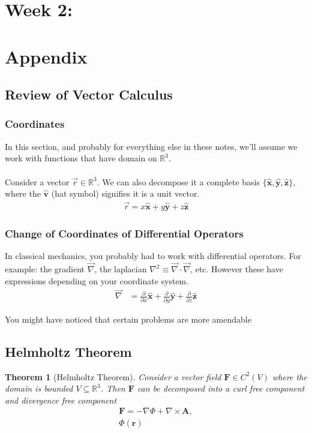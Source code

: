 \documentclass[12pt,fleqn]{article}
\numberwithin{equation}{section} %
\newtheorem{theorem}{Theorem}
\newcounter{problem}
\begin{document}
\newpage
\section{Week 2: }


\newpage
\section{Appendix}

\subsection{Review of Vector Calculus}
\subsubsection{Coordinates}
In this section, and probably for everything else in these notes, we'll assume we work with functions that have domain on $\mathbb R^3$.\\
\\
Consider a vector $\vec r \in \mathbb R^3$. We can also decompose it a complete basis $\{\mathbf{\hat x}, \mathbf{\hat y}, \mathbf{\hat z}\}$, where the $\mathbf{\hat v}$ (hat symbol) signifies it is a unit vector.
\begin{align}
	\vec r  = x \mathbf{\hat x} + y \mathbf{\hat y} + z \mathbf {\hat z}
\end{align}




\subsubsection{Change of Coordinates of Differential Operators}
In classical mechanics, you probably had to work with differential operators. For example: the gradient $\vec \nabla$, the laplacian $\nabla^2 \equiv \vec \nabla \cdot \vec \nabla$, etc. However these have expressions depending on your coordinate system.
\begin{align}
	\vec \nabla & = \frac{\partial}{\partial x} \mathbf{\hat x} + \frac{\partial}{\partial y} \mathbf{\hat y} + \frac{\partial}{\partial z} \mathbf{\hat z}
\end{align}


 You might have noticed that certain problems are more amendable 



\subsection{Helmholtz Theorem}
\begin{theorem}
	[Helmholtz Theorem] Consider a vector field $\mathbf F \in C^2(V)$ where the domain is bounded $V \subseteq \mathbb R^3$. Then $\mathbf F$ can be decomposed into a curl free component and divergence free component
	\begin{align}
		\mathbf F = - \nabla \Phi + \nabla \times \mathbf A,\\
		\Phi(\mathbf r)
	\end{align}
\end{theorem}
\end{document}
